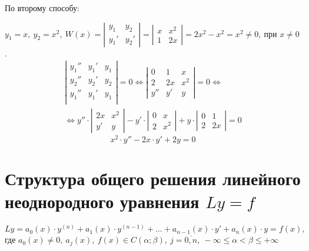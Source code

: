 \begin{example}
    По второму способу:

    $y_1 = x, \ y_2 = x^2, \ W(x) = \left|\begin{array}{cc}
            y_1 & y_2 \\ y_1' & y_2'
        \end{array}\right| = \left|\begin{array}{cc}
            x & x^2 \\ 1 & 2x
        \end{array}\right| = 2x^2 - x^2 = x^2 \ne 0, \ \text{при } x\ne 0$.
    \begin{multline*}
        \left|\begin{array}{ccc}
            y_1'' & y_1' & y_1 \\
            y_2'' & y_2' & y_2 \\
            y_1'' & y_1' & y_1 \\
        \end{array}\right| = 0 \iff \left|\begin{array}{ccc}
            0   & 1  & x   \\
            2   & 2x & x^2 \\
            y'' & y' & y
        \end{array}\right| = 0 \iff \\
        \iff y'' \cdot \left|\begin{array}{cc}
            2x & x^2 \\ y' & y
        \end{array}\right| - y' \cdot \left|\begin{array}{cc}
            0 & x \\ 2 & x^2
        \end{array}\right| + y \cdot \left|\begin{array}{cc}
            0 & 1 \\ 2 & 2x
        \end{array}\right| = 0
    \end{multline*}
    \[
        x^2 \cdot y'' - 2x \cdot y' + 2y = 0
    \]
\end{example}

\section{Структура общего решения линейного неоднородного уравнения $Ly = f$}

\begin{note}
    \begin{equation}\label{eq36}
        Ly = a_0(x) \cdot y^{(n)} + a_1(x) \cdot y^{(n-1)} + \ldots + a_{n-1}(x)\cdot y' + a_n(x) \cdot y = f(x),
    \end{equation}
    где $a_0(x)\ne0, \ a_j(x), \ f(x) \in C(\alpha;\beta), \ j = \overline{0,n}, \ -\infty \leqslant \alpha <\beta \leqslant +\infty$
\end{note}

